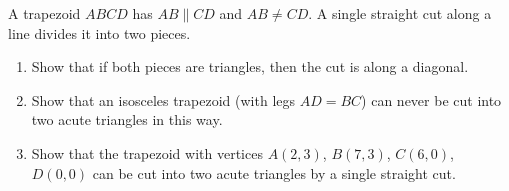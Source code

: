 A trapezoid $ABCD$ has $AB\parallel CD$ and $AB\ne CD$. A single straight cut along a line divides it into two pieces.
\begin{enumerate}
\item[(a)] Show that if both pieces are triangles, then the cut is along a diagonal.
\item[(b)] Show that an isosceles trapezoid (with legs $AD=BC$) can never be cut into two acute triangles in this way.
\item[(c)] Show that the trapezoid with vertices $A(2,3)$, $B(7,3)$, $C(6,0)$, $D(0,0)$ can be cut into two acute triangles by a single straight cut.
\end{enumerate}
